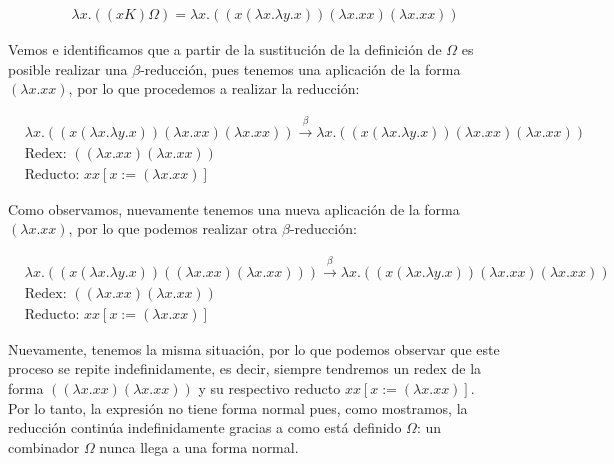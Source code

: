 \documentclass[11pt]{article}
\begin{document}
\begin{enumerate}[leftmargin=0.8cm]
\begin{enumerate}
        \begin{align*}
            & \lambda x.((xK)\Omega)= \lambda x. ((x(\lambda x.\lambda y.x)) (\lambda x.xx) (\lambda x.xx))
        \end{align*}

        Vemos e identificamos que a partir de la sustitución de la definición de $\Omega$ es posible realizar una $\beta$-reducción, pues tenemos una aplicación de la forma $(\lambda x.xx)$, por lo que procedemos a realizar la reducción:

        \begin{align*}
            & \lambda x.((x(\lambda x.\lambda y.x)) (\lambda x.xx) (\lambda x.xx)) \xrightarrow{\beta} \lambda x.((x(\lambda x.\lambda y.x)) (\lambda x.xx)(\lambda x.xx))\\
            & \text{Redex: } ((\lambda x.xx)(\lambda x.xx))\\
            & \text{Reducto: } xx[x:= (\lambda x.xx)]
        \end{align*} 

        Como observamos, nuevamente tenemos una nueva aplicación de la forma $(\lambda x.xx)$, por lo que podemos realizar otra $\beta$-reducción:

        \begin{align*}
            & \lambda x.((x(\lambda x.\lambda y.x)) ((\lambda x.xx)(\lambda x.xx)))\xrightarrow{\beta} \lambda x.((x(\lambda x.\lambda y.x)) (\lambda x.xx)(\lambda x.xx))\\
            & \text{Redex: } ((\lambda x.xx)(\lambda x.xx))\\
            & \text{Reducto: } xx[x:= (\lambda x.xx)] 
        \end{align*}

        Nuevamente, tenemos la misma situación, por lo que podemos observar que este proceso se repite indefinidamente, es decir, siempre tendremos un redex de la forma $((\lambda x.xx)(\lambda x.xx))$ y su respectivo reducto $xx[x:= (\lambda x.xx)]$.\\

        Por lo tanto, la expresión no tiene forma normal pues, como mostramos, la reducción continúa indefinidamente gracias a como está definido $\Omega$: un combinador $\Omega$ nunca llega a una forma normal. 



\end{enumerate}
\end{enumerate}
\end{document}
